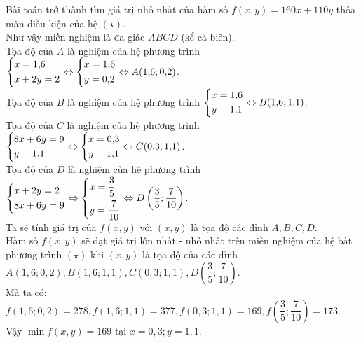 \begin{ex}
{{

}
Bài toán trở thành tìm giá trị nhỏ nhất của hàm số $f(x,y) = 160x + 110y$ thỏa mãn điều kiện của hệ $(\star)$.\\
Như vậy miền nghiệm là đa giác $ABCD$ (kể cả biên).\\
Tọa độ của $A$ là nghiệm của hệ phương trình $\left\{\begin{aligned}&x=1{,}6\\&x+2y=2\end{aligned}\right.\Leftrightarrow \left\{\begin{aligned}&x=1{,}6\\&y=0{,}2\end{aligned}\right.\Leftrightarrow A(1{,}6;0{,}2)$.\\
Tọa độ của $B$ là nghiệm của hệ phương trình $\left\{\begin{aligned}&x=1{,}6\\&y=1{,}1\end{aligned}\right.\Leftrightarrow B(1{,}6; 1{,}1)$.\\
Tọa độ của $C$ là nghiệm của hệ phương trình $\left\{\begin{aligned}&8x+6y=9\\&y=1{,}1\end{aligned}\right.\Leftrightarrow\left\{\begin{aligned}&x=0{,}3\\&y=1{,}1\end{aligned}\right.\Leftrightarrow C(0{,}3; 1{,}1)$.\\
Tọa độ của $D$ là nghiệm của hệ phương trình $\left\{\begin{aligned}&x+2y=2\\&8x+6y=9\end{aligned}\right.\Leftrightarrow\left\{\begin{aligned}&x=\dfrac{3}{5}\\&y=\dfrac{7}{10}\end{aligned}\right.\Leftrightarrow D\left(\dfrac{3}{5};\dfrac{7}{10}\right)$.\\
Ta sẽ tính giá trị của  $f(x,y)$ với $(x,y)$ là tọa độ các đỉnh $A, B, C, D$.\\
Hàm số $f(x,y)$ sẽ đạt giá trị lớn nhất - nhỏ nhất trên miền nghiệm của hệ bất phương trình $(\star)$ khi $(x,y)$ là tọa độ của các đỉnh $A(1{,}6;0{,}2), B(1{,}6; 1{,}1), C(0{,}3; 1{,}1), D\left(\dfrac{3}{5};\dfrac{7}{10}\right)$.\\
Mà ta có: $f(1{,}6;0{,}2)=278, f(1{,}6; 1{,}1)= 377, f(0{,}3; 1{,}1)= 169, f\left(\dfrac{3}{5};\dfrac{7}{10}\right)= 173$.\\
Vậy $\min f(x,y) =169$ tại $x = 0{,}3; y = 1{,}1$.
}
\end{ex}

